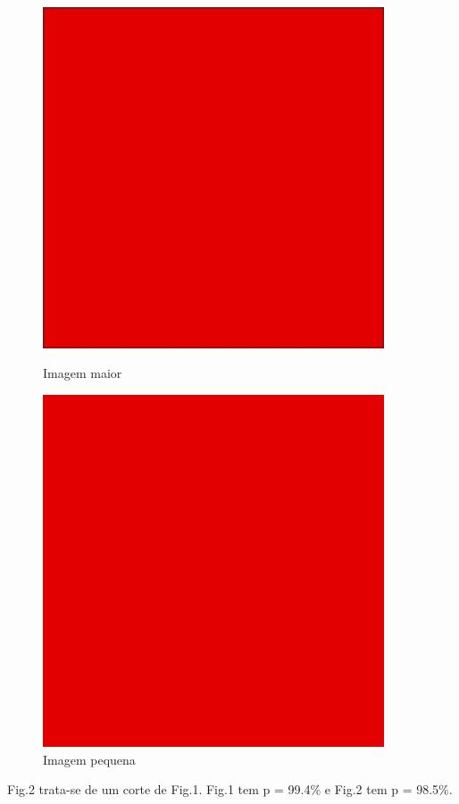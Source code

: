 \documentclass[12pt]{article}
\begin{document}
\begin{figure}[htb!]
    \centering
    \begin{minipage}{0.45\textwidth}
        \centering
        \includegraphics[width=0.9\textwidth]{red.png}
        \caption{Imagem maior}
    \end{minipage}\hfill
    \begin{minipage}{0.45\textwidth}
        \centering
        \includegraphics[width=0.9\textwidth]{redpequeno.png} 
        \caption{Imagem pequena}
    \end{minipage}
\end{figure}
\centering
Fig.2 trata-se de um corte de Fig.1. Fig.1 tem p = 99.4\% e Fig.2 tem p = 98.5\%.
\flushleft
\newpage
\end{document}
